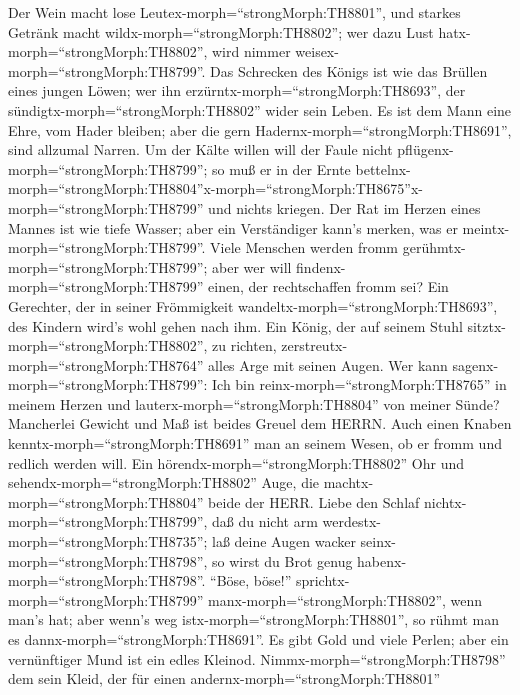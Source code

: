  Der Wein macht lose Leutex-morph=``strongMorph:TH8801'',
und starkes Getränk macht wildx-morph=``strongMorph:TH8802''; wer dazu
Lust hatx-morph=``strongMorph:TH8802'', wird nimmer
weisex-morph=``strongMorph:TH8799''.  Das Schrecken des
Königs ist wie das Brüllen eines jungen Löwen; wer ihn
erzürntx-morph=``strongMorph:TH8693'', der
sündigtx-morph=``strongMorph:TH8802'' wider sein Leben.  Es
ist dem Mann eine Ehre, vom Hader bleiben; aber die gern
Hadernx-morph=``strongMorph:TH8691'', sind allzumal Narren. 
Um der Kälte willen will der Faule nicht
pflügenx-morph=``strongMorph:TH8799''; so muß er in der Ernte
bettelnx-morph=``strongMorph:TH8804''\textbar x-morph=``strongMorph:TH8675''x-morph=``strongMorph:TH8799''
und nichts kriegen.  Der Rat im Herzen eines Mannes ist wie
tiefe Wasser; aber ein Verständiger kann's merken, was er
meintx-morph=``strongMorph:TH8799''.  Viele Menschen werden
fromm gerühmtx-morph=``strongMorph:TH8799''; aber wer will
findenx-morph=``strongMorph:TH8799'' einen, der rechtschaffen fromm sei?
 Ein Gerechter, der in seiner Frömmigkeit
wandeltx-morph=``strongMorph:TH8693'', des Kindern wird's wohl gehen
nach ihm.  Ein König, der auf seinem Stuhl
sitztx-morph=``strongMorph:TH8802'', zu richten,
zerstreutx-morph=``strongMorph:TH8764'' alles Arge mit seinen Augen.
 Wer kann sagenx-morph=``strongMorph:TH8799'': Ich bin
reinx-morph=``strongMorph:TH8765'' in meinem Herzen und
lauterx-morph=``strongMorph:TH8804'' von meiner Sünde? 
Mancherlei Gewicht und Maß ist beides Greuel dem HERRN. 
Auch einen Knaben kenntx-morph=``strongMorph:TH8691'' man an seinem
Wesen, ob er fromm und redlich werden will.  Ein
hörendx-morph=``strongMorph:TH8802'' Ohr und
sehendx-morph=``strongMorph:TH8802'' Auge, die
machtx-morph=``strongMorph:TH8804'' beide der HERR.  Liebe
den Schlaf nichtx-morph=``strongMorph:TH8799'', daß du nicht arm
werdestx-morph=``strongMorph:TH8735''; laß deine Augen wacker
seinx-morph=``strongMorph:TH8798'', so wirst du Brot genug
habenx-morph=``strongMorph:TH8798''.  ``Böse, böse!''
sprichtx-morph=``strongMorph:TH8799'' manx-morph=``strongMorph:TH8802'',
wenn man's hat; aber wenn's weg istx-morph=``strongMorph:TH8801'', so
rühmt man es dannx-morph=``strongMorph:TH8691''.  Es gibt
Gold und viele Perlen; aber ein vernünftiger Mund ist ein edles Kleinod.
 Nimmx-morph=``strongMorph:TH8798'' dem sein Kleid, der für
einen andernx-morph=``strongMorph:TH8801''
